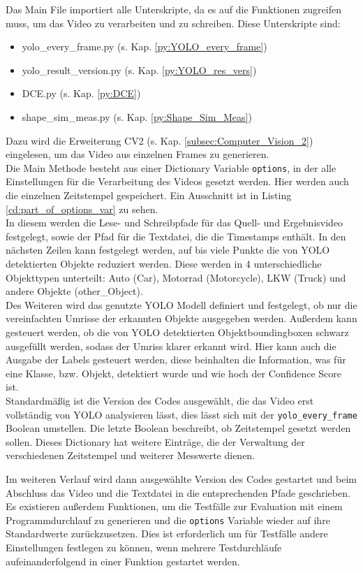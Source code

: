 { 
	Das Main File importiert alle Unterskripte, da es auf die Funktionen zugreifen muss, um das Video zu verarbeiten und zu schreiben. Diese Unterskripte sind: 
	\begin{itemize}
		\item yolo\_every\_frame.py (s. Kap. \ref{py:YOLO_every_frame})
		\item yolo\_result\_version.py (s. Kap. \ref{py:YOLO_res_vers})
		\item DCE.py (s. Kap. \ref{py:DCE})
		\item shape\_sim\_meas.py (s. Kap. \ref{py:Shape_Sim_Meas})
	\end{itemize}
	Dazu wird die Erweiterung CV2 (s. Kap. \ref{subsec:Computer_Vision_2}) eingelesen, um das Video aus einzelnen Frames zu generieren.\\
	Die Main Methode besteht aus einer Dictionary Variable \lstinline|options|, in der alle Einstellungen für die Verarbeitung des Videos gesetzt werden. Hier werden auch die einzelnen Zeitstempel gespeichert. \ifimportant Ein Ausschnitt ist in Listing \ref{cd:part_of_options_var} zu sehen. \fi \\
	In diesem werden die Lese- und Schreibpfade für das Quell- und Ergebnisvideo festgelegt, sowie der Pfad für die Textdatei, die die Timestamps enthält. In den nächsten Zeilen kann festgelegt werden, auf bis viele Punkte die von YOLO detektierten Objekte reduziert werden. Diese werden in 4 unterschiedliche Objekttypen unterteilt: Auto (Car), Motorrad (Motorcycle), LKW (Truck) und andere Objekte (other\_Object). \\
	Des Weiteren wird das genutzte YOLO Modell definiert und festgelegt, ob nur die vereinfachten Umrisse der erkannten Objekte ausgegeben werden. Außerdem kann gesteuert werden, ob die von YOLO detektierten Objektboundingboxen schwarz ausgefüllt werden, sodass der Umriss klarer erkannt wird. Hier kann auch die Ausgabe der Labels gesteuert werden, diese beinhalten die Information, was für eine Klasse, bzw. Objekt, detektiert wurde und wie hoch der Confidence Score ist. \\
	Standardmäßig ist die Version des Codes ausgewählt, die das Video erst vollständig von YOLO analysieren lässt, dies lässt sich mit der \lstinline|yolo_every_frame| Boolean umstellen. Die letzte Boolean beschreibt, ob Zeitstempel gesetzt werden sollen. Dieses Dictionary hat weitere Einträge, die der Verwaltung der verschiedenen Zeitstempel und weiterer Messwerte dienen. \\
	\ifimportant
	
	\fi	Im weiteren Verlauf wird dann ausgewählte Version des Codes gestartet und beim Abschluss das Video und die Textdatei in die entsprechenden Pfade geschrieben.
	Es existieren außerdem Funktionen, um die Testfälle zur Evaluation mit einem Programmdurchlauf zu generieren und die \lstinline|options| Variable wieder auf ihre Standardwerte zurückzusetzen. Dies ist erforderlich um für Testfälle andere Einstellungen festlegen zu können, wenn mehrere Testdurchläufe aufeinanderfolgend in einer Funktion gestartet werden.
}




